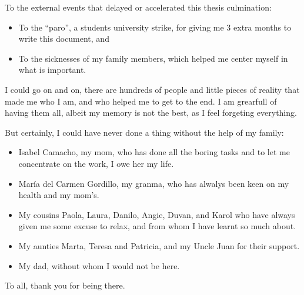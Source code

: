 \documentclass[
11pt, %
english, %
singlespacing, %
headsepline, %
]{MastersDoctoralThesis} %
\providecommand{\tightlist}{%
  \setlength{\itemsep}{0pt}\setlength{\parskip}{0pt}}
\begin{document}
\begin{acknowledgements}
To the external events that delayed or accelerated this thesis culmination:

\begin{itemize}
\tightlist
\item To the \enquote{paro}, a students university strike, for giving me 3 extra months to
  write this document,  and
\item To the sicknesses of my family members, which helped me center myself in what is
  important.
\end{itemize}

I could go on and on, there are hundreds of people and little pieces of
reality that made me who I am, and who helped me to get to the end. I am
grearfull of having them all, albeit my memory is not the best, as I
feel forgeting everything.

But certainly, I could have never done a thing without the help of my
family:

\begin{itemize}
\tightlist
\item Isabel Camacho, my mom, who has done all the boring tasks and to let me concentrate
  on the work, I owe her my life.
\item María del Carmen Gordillo, my granma, who has alwalys been keen on my health and my
  mom's.
\item My cousins Paola, Laura, Danilo, Angie, Duvan, and Karol who have always given me
  some excuse to relax, and from whom I have learnt so much about.
\item My aunties Marta, Teresa and Patricia, and my Uncle Juan for their support.
\item My dad, without whom I would not be here.
\end{itemize}

To all, thank you for being there.

\end{acknowledgements}


\tableofcontents %




\end{document}
